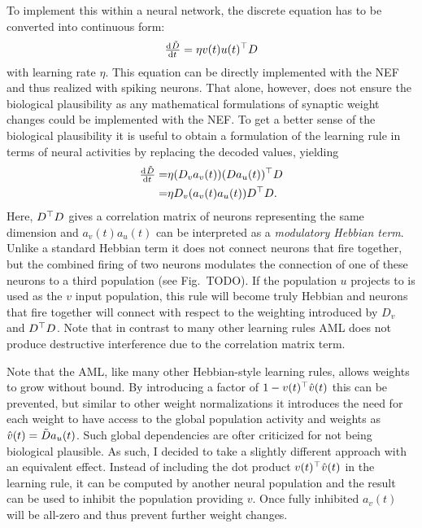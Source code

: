 To implement this within a neural network, the discrete equation has to be converted into continuous form:
\begin{equation}
    \od{\tilde{\mat D}}{t} = \eta \vc v(t) \vc u(t)\Tr \mat D
\end{equation}
with learning rate $\eta$.
This equation can be directly implemented with the NEF and thus realized with spiking neurons.
That alone, however, does not ensure the biological plausibility as any mathematical formulations of synaptic weight changes could be implemented with the NEF\@.
To get a better sense of the biological plausibility it is useful to obtain a formulation of the learning rule in terms of neural activities by replacing the decoded values, yielding
\begin{eqnarray}
    \od{\tilde{\mat D}}{t} =& \eta (D_v a_v(t)) (D a_u(t))\Tr D \\
    =& \eta D_v (a_v(t) a_u(t)) D\Tr D \text{.}
\end{eqnarray}
Here, $D^{\top} D$ gives a correlation matrix of neurons representing the same dimension and $a_v(t) a_u(t)$ can be interpreted as a \emph{modulatory Hebbian term}.
Unlike a standard Hebbian term it does not connect neurons that fire together, but the combined firing of two neurons modulates the connection of one of these neurons to a third population (see Fig.~TODO).
If the population $u$ projects to is used as the $v$ input population, this rule will become truly Hebbian and neurons that fire together will connect with respect to the weighting introduced by $D_v$ and $D^{\top} D$.
Note that in contrast to many other learning rules AML does not produce destructive interference due to the correlation matrix term.

Note that the AML, like many other Hebbian-style learning rules, allows weights to grow without bound.
By introducing a factor of $1 - v(t)^{\top} \hat{v}(t)$ this can be prevented, but similar to other weight normalizations it introduces the need for each weight to have access to the global population activity and weights as $\hat{v}(t) = \tilde{D} a_u(t)$.
Such global dependencies are ofter criticized for not being biological plausible.
As such, I decided to take a slightly different approach with an equivalent effect.
Instead of including the dot product $v(t)^{\top} \hat{v}(t)$ in the learning rule, it can be computed by another neural population and the result can be used to inhibit the population providing $v$.
Once fully inhibited $a_v(t)$ will be all-zero and thus prevent further weight changes.

